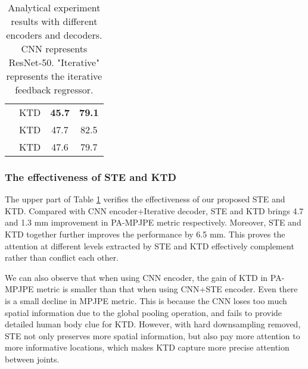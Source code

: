\documentclass[10pt,twocolumn,letterpaper]{article}
\begin{document}
{{\begin{table}[]
\begin{center}
{\begin{tabular}{|l|l|cc|}
                                & KTD                            & \textbf{45.7}                & \textbf{79.1}              \\
                                & KTD          & 47.7                         & 82.5                       \\
                                & KTD         & 47.6                         & 79.7                       \\ \hline
\end{tabular}
}
\end{center}
\caption{Analytical experiment results with different encoders and decoders. CNN represents ResNet-50. "Iterative" represents the iterative feedback regressor.}
\label{tab:ablation}
\end{table}







\subsubsection{The effectiveness of STE and KTD}

The upper part of Table \ref{tab:ablation} verifies the effectiveness of our proposed STE and KTD. Compared with CNN encoder+Iterative decoder, STE and KTD brings 4.7 and 1.3 mm improvement in PA-MPJPE metric respectively. Moreover, STE and KTD together further improves the performance by 6.5 mm. This proves the attention at different levels extracted by STE and KTD effectively complement rather than conflict each other.


We can also observe that when using CNN encoder, the gain of KTD in PA-MPJPE metric is smaller than that when using CNN+STE encoder. Even there is a small decline in MPJPE metric. This is because the CNN loses too much spatial information due to the global pooling operation, and fails to provide detailed human body clue for KTD. However, with hard downsampling removed, STE not only preserves more spatial information, but also pay more attention to more informative locations, which makes KTD capture more precise attention between joints.


}}
\end{document}
